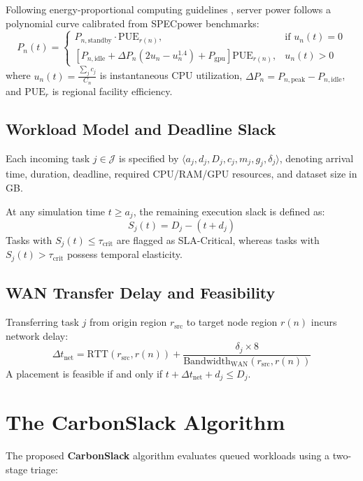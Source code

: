 \documentclass[conference]{IEEEtran}
\begin{document}
Following energy-proportional computing guidelines \cite{barroso2007case}, server power follows a polynomial curve calibrated from SPECpower benchmarks:
\begin{equation}
P_n(t) = \begin{cases}
P_{n,\text{standby}} \cdot \text{PUE}_{r(n)}, & \text{if } u_n(t) = 0 \\
\left[ P_{n,\text{idle}} + \Delta P_n (2 u_n - u_n^{1.4}) + P_{\text{gpu}} \right] \text{PUE}_{r(n)}, & u_n(t) > 0
\end{cases}
\end{equation}
where $u_n(t) = \frac{\sum_{j} c_j}{C_n}$ is instantaneous CPU utilization, $\Delta P_n = P_{n,\text{peak}} - P_{n,\text{idle}}$, and $\text{PUE}_{r}$ is regional facility efficiency.

\subsection{Workload Model and Deadline Slack}
Each incoming task $j \in \mathcal{J}$ is specified by $\langle a_j, d_j, D_j, c_j, m_j, g_j, \delta_j \rangle$, denoting arrival time, duration, deadline, required CPU/RAM/GPU resources, and dataset size in GB.

At any simulation time $t \ge a_j$, the remaining execution slack is defined as:
\begin{equation}
S_j(t) = D_j - (t + d_j)
\end{equation}
Tasks with $S_j(t) \le \tau_{\text{crit}}$ are flagged as SLA-Critical, whereas tasks with $S_j(t) > \tau_{\text{crit}}$ possess temporal elasticity.

\subsection{WAN Transfer Delay and Feasibility}
Transferring task $j$ from origin region $r_{\text{src}}$ to target node region $r(n)$ incurs network delay:
\begin{equation}
\Delta t_{\text{net}} = \text{RTT}(r_{\text{src}}, r(n)) + \frac{\delta_j \times 8}{\text{Bandwidth}_{\text{WAN}}(r_{\text{src}}, r(n))}
\end{equation}
A placement is feasible if and only if $t + \Delta t_{\text{net}} + d_j \le D_j$.

\section{The CarbonSlack Algorithm}
The proposed \textbf{CarbonSlack} algorithm evaluates queued workloads using a two-stage triage:
\end{document}
